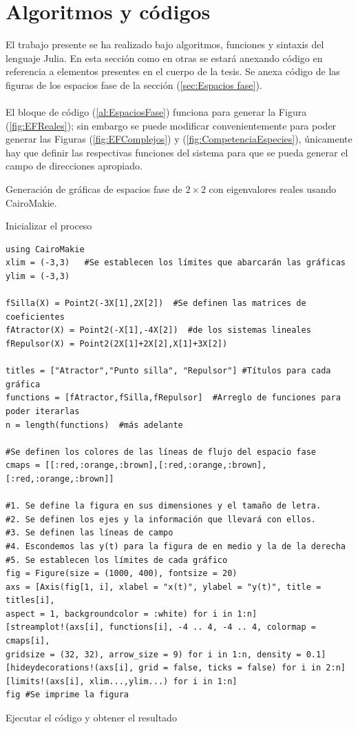 \section{Algoritmos y códigos}

El trabajo presente se ha realizado bajo algoritmos, funciones y sintaxis del lenguaje Julia. En esta sección como en otras se estará anexando código en referencia a elementos presentes en el cuerpo de la tesis. Se anexa código de las figuras de los espacios fase de la sección (\ref{sec:Espacios fase}).\\
\\
El bloque de código (\ref{al:EspaciosFase}) funciona para generar la Figura (\ref{fig:EFReales}); sin embargo se puede modificar convenientemente para poder generar las Figuras (\ref{fig:EFComplejos}) y (\ref{fig:CompetenciaEspecies}), únicamente hay que definir las respectivas funciones del sistema para que se pueda generar el campo de direcciones apropiado.
\begin{algorithm}
	\caption{Generación de gráficas de espacios fase de $2\times 2$ con eigenvalores reales usando CairoMakie.}
	\label{al:EspaciosFase}
	Inicializar el proceso\;	
	\begin{verbatim}
using CairoMakie
xlim = (-3,3)	#Se establecen los límites que abarcarán las gráficas
ylim = (-3,3)

fSilla(X) = Point2(-3X[1],2X[2])  #Se definen las matrices de coeficientes
fAtractor(X) = Point2(-X[1],-4X[2])  #de los sistemas lineales
fRepulsor(X) = Point2(2X[1]+2X[2],X[1]+3X[2])

titles = ["Atractor","Punto silla", "Repulsor"] #Títulos para cada gráfica
functions = [fAtractor,fSilla,fRepulsor]  #Arreglo de funciones para poder iterarlas
n = length(functions)  #más adelante

#Se definen los colores de las líneas de flujo del espacio fase
cmaps = [[:red,:orange,:brown],[:red,:orange,:brown],[:red,:orange,:brown]]

#1. Se define la figura en sus dimensiones y el tamaño de letra.
#2. Se definen los ejes y la información que llevará con ellos. 
#3. Se definen las líneas de campo
#4. Escondemos las y(t) para la figura de en medio y la de la derecha
#5. Se establecen los límites de cada gráfico
fig = Figure(size = (1000, 400), fontsize = 20)
axs = [Axis(fig[1, i], xlabel = "x(t)", ylabel = "y(t)", title = titles[i],
aspect = 1, backgroundcolor = :white) for i in 1:n]
[streamplot!(axs[i], functions[i], -4 .. 4, -4 .. 4, colormap = cmaps[i],
gridsize = (32, 32), arrow_size = 9) for i in 1:n, density = 0.1]
[hideydecorations!(axs[i], grid = false, ticks = false) for i in 2:n]
[limits!(axs[i], xlim...,ylim...) for i in 1:n]
fig	#Se imprime la figura
	\end{verbatim}
	 Ejecutar el código y obtener el resultado\;
\end{algorithm}
